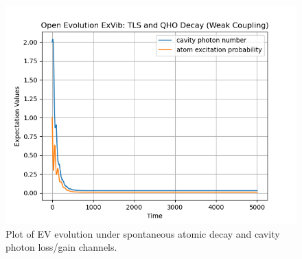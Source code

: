\documentclass[12pt]{article}
\begin{document}
\begin{figure}[h]
    \centering
    \includegraphics[width=\linewidth]{Research Project/Code/results/ExVib/OQS_QHOTLS.png}
    \caption{Plot of EV evolution under spontaneous atomic decay and cavity photon loss/gain channels.}
    \label{EV_OQS_QHOTLS}
\end{figure}



\newpage

 
 
\end{document}
